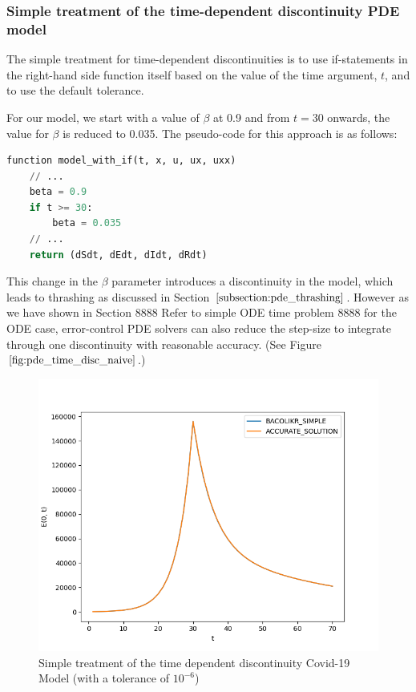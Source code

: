 \documentclass{article}
\begin{document}
\subsubsection{Simple treatment of the time-dependent discontinuity PDE model}
\label{subsubsection:pde_time_naive}
The simple treatment for time-dependent discontinuities is to use if-statements in the right-hand side function itself based on the value of the time argument, $t$, and to use the default tolerance.

For our model, we start with a value of $\beta$ at 0.9 and from $t=30$ onwards, the value for $\beta$ is reduced to 0.035. The pseudo-code for this approach is as follows:

\begin{minipage}{\linewidth}
\begin{lstlisting}[language=Python]
function model_with_if(t, x, u, ux, uxx)
	// ...
	beta = 0.9
	if t >= 30:
		beta = 0.035
	// ...
	return (dSdt, dEdt, dIdt, dRdt)

\end{lstlisting}
\end{minipage}

This change in the $\beta$ parameter introduces a discontinuity in the model, which leads to thrashing as discussed in Section $\ref{subsection:pde_thrashing}$. However as we have shown in Section 8888 Refer to simple ODE time problem 8888 for the ODE case, error-control PDE solvers can also reduce the step-size to integrate through one discontinuity with reasonable accuracy. (See Figure $\ref{fig:pde_time_disc_naive}$.)

\begin{figure}[H]
\centering
\includegraphics[width=0.7\linewidth]{./figures/pde_time_disc_naive}
\caption{Simple treatment of the time dependent discontinuity Covid-19 Model (with a tolerance of $10^{-6}$)}
\label{fig:pde_time_disc_naive}
\end{figure}
\end{document}
